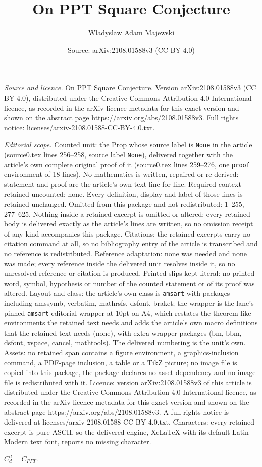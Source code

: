 \documentclass[10pt,a4paper]{amsart}
\title[On PPT Square Conjecture]{On PPT Square Conjecture}
\author{Wladyslaw Adam Majewski}
\date{Source: arXiv:2108.01588v3 (CC BY 4.0)}
\begin{document}
\maketitle

\noindent\emph{Source and licence.} On PPT Square Conjecture. Version arXiv:2108.01588v3 (CC BY 4.0), distributed under the Creative Commons Attribution 4.0 International licence, as recorded in the arXiv licence metadata for this exact version and shown on the abstract page https://arxiv.org/abs/2108.01588v3. Full rights notice: licenses/arxiv-2108.01588-CC-BY-4.0.txt.\par\smallskip

\noindent\textit{Editorial scope.} Counted unit: the Prop whose source label is \texttt{None} in the article (source0.tex lines 256--258, source label \texttt{None}), delivered together with the article's own complete original proof of it (source0.tex lines 259--276, one \texttt{proof} environment of 18 lines). No mathematics is written, repaired or re-derived: statement and proof are the article's own text line for line. Required context retained uncounted: none. Every definition, display and label of those lines is retained unchanged. Omitted from this package and not redistributed: 1--255, 277--625. Nothing inside a retained excerpt is omitted or altered: every retained body is delivered exactly as the article's lines are written, so no omission receipt of any kind accompanies this package. Citations: the retained excerpts carry no citation command at all, so no bibliography entry of the article is transcribed and no reference is redistributed. Reference adaptation: none was needed and none was made; every reference inside the delivered unit resolves inside it, so no unresolved reference or citation is produced. Printed slips kept literal: no printed word, symbol, hypothesis or number of the counted statement or of its proof was altered. Layout and class: the article's own class is \texttt{amsart} with packages including amssymb, verbatim, mathrsfs, dsfont, braket; the wrapper is the lane's pinned \texttt{amsart} editorial wrapper at 10pt on A4, which restates the theorem-like environments the retained text needs and adds the article's own macro definitions that the retained text needs (none), with extra wrapper packages (bm, bbm, dsfont, xspace, cancel, mathtools). The delivered numbering is the unit's own. Assets: no retained span contains a figure environment, a graphics-inclusion command, a PDF-page inclusion, a table or a TikZ picture; no image file is copied into this package, the package declares no asset dependency and no image file is redistributed with it. Licence: version arXiv:2108.01588v3 of this article is distributed under the Creative Commons Attribution 4.0 International licence, as recorded in the arXiv licence metadata for this exact version and shown on the abstract page https://arxiv.org/abs/2108.01588v3. A full rights notice is delivered at licenses/arxiv-2108.01588-CC-BY-4.0.txt. Characters: every retained excerpt is pure ASCII, so the delivered engine, XeLaTeX with its default Latin Modern text font, reports no missing character.
\begin{prop}
$C^d_d = C_{PPT}.$
\end{prop}
\end{document}
